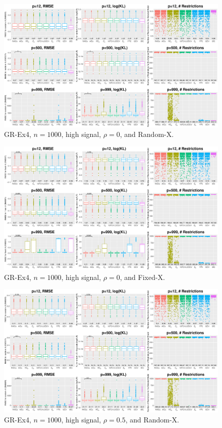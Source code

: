 \clearpage
\begin{figure}[!ht]
\centering
\includegraphics[width=\textwidth]{figures/supplement/randomx_GR-Ex4_n1000_hsnr_rho0.eps}
\caption{GR-Ex4, $n=1000$, high signal, $\rho=0$, and Random-X.}
\end{figure}
\begin{figure}[!ht]
\centering
\includegraphics[width=\textwidth]{figures/supplement/fixedx_GR-Ex4_n1000_hsnr_rho0.eps}
\caption{GR-Ex4, $n=1000$, high signal, $\rho=0$, and Fixed-X.}
\end{figure}
\clearpage
\begin{figure}[!ht]
\centering
\includegraphics[width=\textwidth]{figures/supplement/randomx_GR-Ex4_n1000_hsnr_rho05.eps}
\caption{GR-Ex4, $n=1000$, high signal, $\rho=0.5$, and Random-X.}
\end{figure}
